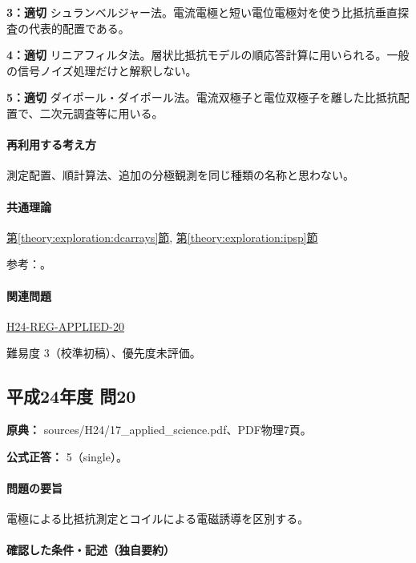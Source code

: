 \noindent\textbf{3：適切} シュランベルジャー法。電流電極と短い電位電極対を使う比抵抗垂直探査の代表的配置である。\par

\noindent\textbf{4：適切} リニアフィルタ法。層状比抵抗モデルの順応答計算に用いられる。一般の信号ノイズ処理だけと解釈しない。\par

\noindent\textbf{5：適切} ダイポール・ダイポール法。電流双極子と電位双極子を離した比抵抗配置で、二次元調査等に用いる。\par

\paragraph{再利用する考え方} 測定配置、順計算法、追加の分極観測を同じ種類の名称と思わない。

\paragraph{共通理論} \hyperref[theory:exploration:dcarrays]{第\ref*{theory:exploration:dcarrays}節}, \hyperref[theory:exploration:ipsp]{第\ref*{theory:exploration:ipsp}節}

\par 参考：\cite{epa_resistivity,epa_ip,usgs_linear_filter1981}。

\paragraph{関連問題} \hyperref[q:h24-reg-applied-20]{H24-REG-APPLIED-20}

\par 難易度 3（校準初稿）、優先度未評価。

\subsection{平成24年度 問20}
\label{q:h24-reg-applied-20}

\noindent\textbf{原典：} sources/H24/17\_applied\_science.pdf、PDF物理7頁。

\textbf{公式正答：} 5（single）。

\paragraph{問題の要旨} 電極による比抵抗測定とコイルによる電磁誘導を区別する。

\paragraph{確認した条件・記述（独自要約）}\mbox{}\par

